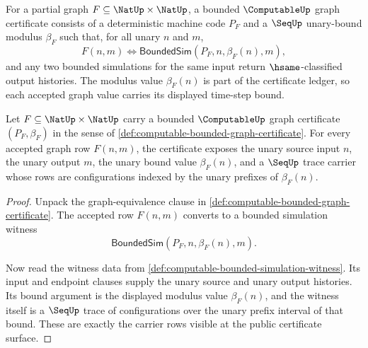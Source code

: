 \begin{definition}
\label{def:computable-bounded-graph-certificate}
For a partial graph $F\subseteq\NatUp\times\NatUp$, a bounded $\ComputableUp$ graph certificate consists of a deterministic machine code $P_F$ and a $\SeqUp$ unary-bound modulus $\beta_F$ such that, for all unary $n$ and $m$,
$$
  F(n,m)\Longleftrightarrow \mathsf{BoundedSim}(P_F,n,\beta_F(n),m),
$$
and any two bounded simulations for the same input return $\hsame$-classified output histories. The modulus value $\beta_F(n)$ is part of the certificate ledger, so each accepted graph value carries its displayed time-step bound.
\end{definition}

\begin{theorem}
\label{thm:computable-carrier-obligation}
Let $F\subseteq\NatUp\times\NatUp$ carry a bounded $\ComputableUp$ graph certificate $(P_F,\beta_F)$ in the sense of \autoref{def:computable-bounded-graph-certificate}. For every accepted graph row $F(n,m)$, the certificate exposes the unary source input $n$, the unary output $m$, the unary bound value $\beta_F(n)$, and a $\SeqUp$ trace carrier whose rows are configurations indexed by the unary prefixes of $\beta_F(n)$.
\end{theorem}
\begin{proof}
Unpack the graph-equivalence clause in \autoref{def:computable-bounded-graph-certificate}. The accepted row $F(n,m)$ converts to a bounded simulation witness
$$
  \mathsf{BoundedSim}(P_F,n,\beta_F(n),m).
$$

Now read the witness data from \autoref{def:computable-bounded-simulation-witness}. Its input and endpoint clauses supply the unary source and unary output histories. Its bound argument is the displayed modulus value $\beta_F(n)$, and the witness itself is a $\SeqUp$ trace of configurations over the unary prefix interval of that bound. These are exactly the carrier rows visible at the public certificate surface.
\end{proof}

